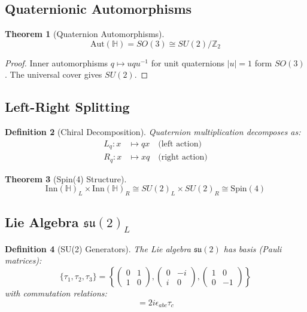 \documentclass[12pt]{article}
\newtheorem{definition}{Definition}[section]
\newtheorem{theorem}[definition]{Theorem}
\renewcommand{\H}{\mathbb{H}}
\newcommand{\su}{\mathfrak{su}}
\newcommand{\Aut}{\mathrm{Aut}}
\begin{document}
\subsection{Quaternionic Automorphisms}

\begin{theorem}[Quaternion Automorphisms]
\begin{equation}
\Aut(\H) = SO(3) \cong SU(2) / \mathbb{Z}_2
\end{equation}
\end{theorem}

\begin{proof}
Inner automorphisms $q \mapsto uqu^{-1}$ for unit quaternions $|u|=1$ form $SO(3)$. The universal cover gives $SU(2)$.
\end{proof}

\subsection{Left-Right Splitting}

\begin{definition}[Chiral Decomposition]
Quaternion multiplication decomposes as:
\begin{align}
L_q: x &\mapsto qx \quad \text{(left action)} \\
R_q: x &\mapsto xq \quad \text{(right action)}
\end{align}
\end{definition}

\begin{theorem}[Spin(4) Structure]
\begin{equation}
\mathrm{Inn}(\H)_L \times \mathrm{Inn}(\H)_R \cong SU(2)_L \times SU(2)_R \cong \mathrm{Spin}(4)
\end{equation}
\end{theorem}

\subsection{Lie Algebra $\su(2)_L$}

\begin{definition}[SU(2) Generators]
The Lie algebra $\su(2)$ has basis (Pauli matrices):
\begin{equation}
\{\tau_1, \tau_2, \tau_3\} = \left\{\begin{pmatrix}0&1\\1&0\end{pmatrix}, \begin{pmatrix}0&-i\\i&0\end{pmatrix}, \begin{pmatrix}1&0\\0&-1\end{pmatrix}\right\}
\end{equation}
with commutation relations:
\begin{equation}
[\tau_a, \tau_b] = 2i \epsilon_{abc} \tau_c
\end{equation}
\end{definition}
\end{document}
